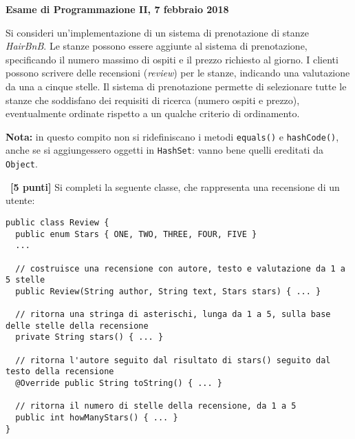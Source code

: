 \documentclass{article}[10pt]
\newcounter{esnu}
\newenvironment{esercizio}{\medskip \noindent {\bf Esercizio\addtocounter{esnu}{1} \arabic{esnu}}}{}
\begin{document}
\begin{center} {\bf Esame di Programmazione II, 7 febbraio 2018}\end{center}

Si consideri un'implementazione di un sistema di prenotazione di stanze \emph{HairBnB}.
Le stanze possono essere aggiunte al sistema di prenotazione, specificando il numero
massimo di ospiti e il prezzo richiesto al giorno. I clienti possono scrivere delle
recensioni (\emph{review}) per le stanze, indicando una valutazione da una a cinque stelle.
Il sistema di prenotazione permette di selezionare tutte le stanze che soddisfano dei
requisiti di ricerca (numero ospiti e prezzo), eventualmente ordinate rispetto a un qualche
criterio di ordinamento.

\textbf{Nota: } in questo compito non si ridefiniscano i metodi \texttt{equals()} e
\texttt{hashCode()}, anche se si aggiungessero oggetti in \texttt{HashSet}: vanno bene
quelli ereditati da \texttt{Object}.

\begin{esercizio}~\textbf{[5 punti]}
Si completi la seguente classe, che rappresenta una recensione di un utente:
%
\begin{lstlisting}
public class Review {
  public enum Stars { ONE, TWO, THREE, FOUR, FIVE }
  ...

  // costruisce una recensione con autore, testo e valutazione da 1 a 5 stelle
  public Review(String author, String text, Stars stars) { ... }

  // ritorna una stringa di asterischi, lunga da 1 a 5, sulla base delle stelle della recensione
  private String stars() { ... }

  // ritorna l'autore seguito dal risultato di stars() seguito dal testo della recensione
  @Override public String toString() { ... }

  // ritorna il numero di stelle della recensione, da 1 a 5
  public int howManyStars() { ... }
}
\end{lstlisting}
%
\end{esercizio}
\end{document}
